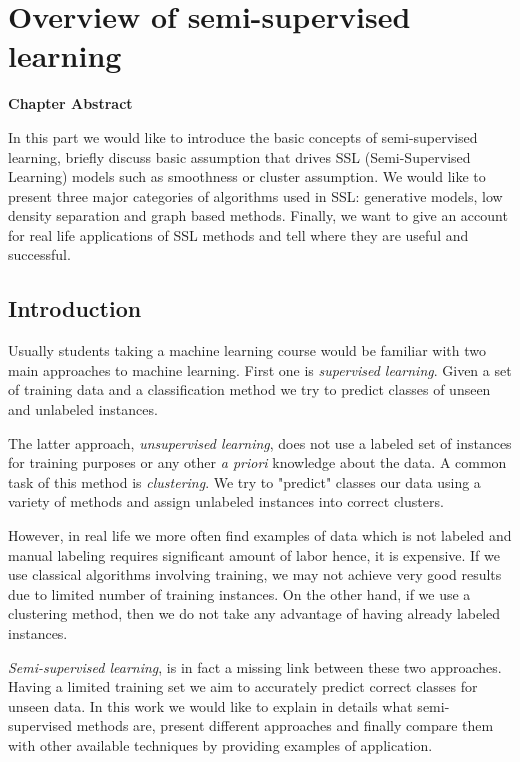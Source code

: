 \documentclass[12pt, a4paper, pdflatex]{report}
\newenvironment{chapabstract}
{
	\vspace{0.5cm}
	\small
	\begin{center}
    \bfseries Chapter Abstract
    \end{center}
}{\vspace{1.5cm}}
\begin{document}
\newpage

\tableofcontents
\thispagestyle{empty}
\cleardoublepage
\pagestyle{plain}
\setcounter{page}{1}

\newpage

\chapter{Overview of semi-supervised learning\label{ch:sstheory}}

\begin{chapabstract}
In this part we would like to introduce the basic concepts of semi-supervised learning, briefly discuss basic assumption that drives SSL (Semi-Supervised Learning) models such as smoothness or cluster assumption. We would like to present three major categories of algorithms used in SSL: generative models, low density separation and graph based methods. Finally, we want to give an account for real life applications of SSL methods and tell where they are useful and successful.
\end{chapabstract}


\section{Introduction}
Usually students taking a machine learning course would be familiar with two main approaches to machine learning. First one is \textit{supervised learning}. Given a set of training data and a classification method we try to predict classes of unseen and unlabeled instances. 

The latter approach, \textit{unsupervised learning}, does not use a labeled set of instances for training purposes or any other \emph{a priori} knowledge about the data. A common task of this method is \textit{clustering}. We try to "predict" classes our data using a variety of methods and assign unlabeled instances into correct clusters.

However, in real life we more often find examples of data which is not labeled and manual labeling requires significant amount of labor hence, it is expensive\cite{Blum98, He07}. If we use classical algorithms involving training, we may not achieve very good results due to limited number of training instances. On the other hand, if we use a clustering method, then we do not take any advantage of having already labeled instances.

\textit{Semi-supervised learning}, is in fact a missing link between these two approaches. Having a limited training set we aim to accurately predict correct classes for unseen data. In this work we would like to explain in details what semi-supervised methods are, present different approaches and finally compare them with other available techniques by providing examples of application.
\end{document}
